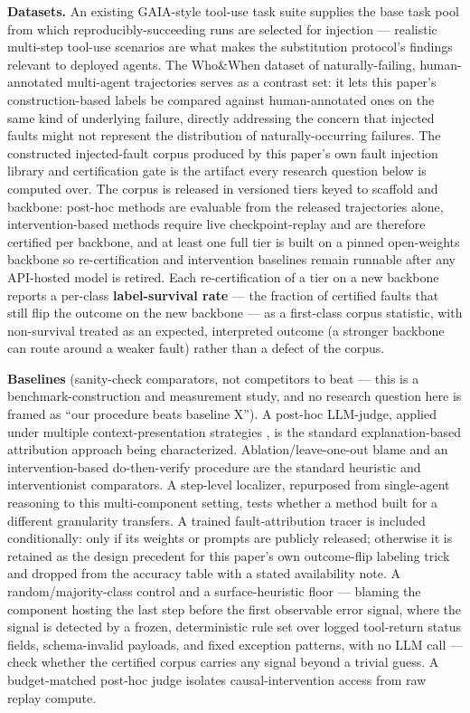 \documentclass[11pt]{article}
\begin{document}
\textbf{Datasets.} An existing GAIA-style tool-use task suite supplies the base task pool from which reproducibly-succeeding runs are selected for injection --- realistic multi-step tool-use scenarios are what makes the substitution protocol's findings relevant to deployed agents. The Who\&When dataset of naturally-failing, human-annotated multi-agent trajectories \citep{WhoAndWhen2025} serves as a contrast set: it lets this paper's construction-based labels be compared against human-annotated ones on the same kind of underlying failure, directly addressing the concern that injected faults might not represent the distribution of naturally-occurring failures. The constructed injected-fault corpus produced by this paper's own fault injection library and certification gate is the artifact every research question below is computed over. The corpus is released in versioned tiers keyed to scaffold and backbone: post-hoc methods are evaluable from the released trajectories alone, intervention-based methods require live checkpoint-replay and are therefore certified per backbone, and at least one full tier is built on a pinned open-weights backbone so re-certification and intervention baselines remain runnable after any API-hosted model is retired. Each re-certification of a tier on a new backbone reports a per-class \textbf{label-survival rate} --- the fraction of certified faults that still flip the outcome on the new backbone --- as a first-class corpus statistic, with non-survival treated as an expected, interpreted outcome (a stronger backbone can route around a weaker fault) rather than a defect of the corpus.

\textbf{Baselines} (sanity-check comparators, not competitors to beat --- this is a benchmark-construction and measurement study, and no research question here is framed as ``our procedure beats baseline X''). A post-hoc LLM-judge, applied under multiple context-presentation strategies \citep{WhoAndWhen2025}, is the standard explanation-based attribution approach being characterized. Ablation/leave-one-out blame and an intervention-based do-then-verify procedure \citep{DoVer2025} are the standard heuristic and interventionist comparators. A step-level localizer, repurposed from single-agent reasoning \citep{CRM2025,FAPO2025} to this multi-component setting, tests whether a method built for a different granularity transfers. A trained fault-attribution tracer \citep{AgenTracer2025} is included conditionally: only if its weights or prompts are publicly released; otherwise it is retained as the design precedent for this paper's own outcome-flip labeling trick and dropped from the accuracy table with a stated availability note. A random/majority-class control and a surface-heuristic floor --- blaming the component hosting the last step before the first observable error signal, where the signal is detected by a frozen, deterministic rule set over logged tool-return status fields, schema-invalid payloads, and fixed exception patterns, with no LLM call --- check whether the certified corpus carries any signal beyond a trivial guess. A budget-matched post-hoc judge isolates causal-intervention access from raw replay compute.
\end{document}
